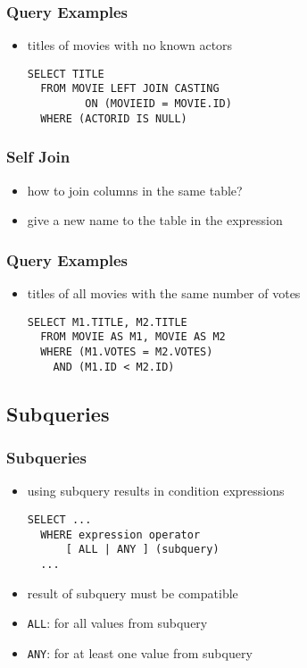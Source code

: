 \documentclass[dvipsnames]{beamer}
\theoremstyle{plain}
\begin{document}
\begin{frame}[fragile]
  \frametitle{Query Examples}

  \begin{itemize}
    \item titles of movies with no known actors
    \begin{lstlisting}
SELECT TITLE
  FROM MOVIE LEFT JOIN CASTING
         ON (MOVIEID = MOVIE.ID)
  WHERE (ACTORID IS NULL)
    \end{lstlisting}
  \end{itemize}
\end{frame}

\begin{frame}[fragile]
  \frametitle{Self Join}

  \begin{itemize}
    \item how to join columns in the same table?
    \item give a new name to the table in the expression
  \end{itemize}
\end{frame}

\begin{frame}[fragile]
  \frametitle{Query Examples}

  \begin{itemize}
    \item titles of all movies with the same number of votes

    \medskip
    \lstinline!SELECT M1.TITLE, M2.TITLE!\\
    \lstinline!  FROM MOVIE AS M1, MOVIE AS M2!\\
    \lstinline!  WHERE (M1.VOTES = M2.VOTES)!\\
    \pause
    \lstinline!    AND (M1.ID < M2.ID)!
  \end{itemize}
\end{frame}

\subsection{Subqueries}

\begin{frame}[fragile]
  \frametitle{Subqueries}

  \begin{itemize}
    \item using subquery results in condition expressions
    \begin{lstlisting}
SELECT ...
  WHERE expression operator
      [ ALL | ANY ] (subquery)
  ...
    \end{lstlisting}

    \item result of subquery must be compatible
    \item \lstinline!ALL!: for all values from subquery
    \item \lstinline!ANY!: for at least one value from subquery
  \end{itemize}
\end{frame}
\end{document}
